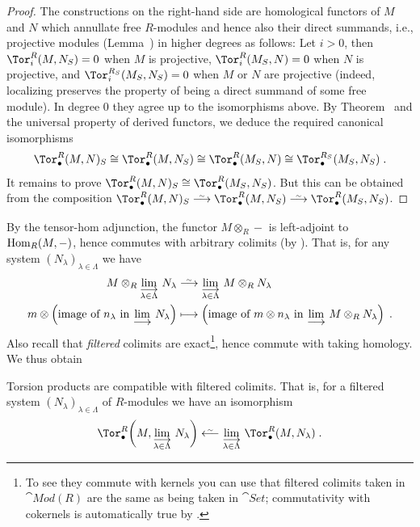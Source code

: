 \documentclass[a4paper,parskip=half,numbers=enddot, DIV=12]{scrreprt}
\begin{document}
\begin{proof}
	The constructions on the right-hand side are homological functors of $M$ and $N$ which annullate free $R$-modules and hence also their direct summands, i.e., projective modules (Lemma~) in higher degrees as follows: Let $i>0$, then $\Tor_i^R(M,N_S)=0$ when $M$ is projective, $\Tor_i^R(M_S,N)=0$ when $N$ is projective, and $\Tor_i^{R_S}(M_S,N_S)=0$ when $M$ or $N$ are projective (indeed, localizing preserves the property of being a direct summand of some free module). In degree $0$ they agree up to the isomorphisms above. By Theorem~ and the universal property of derived functors, we deduce the required canonical isomorphisms
	\begin{align*}
		\Tor_\bullet^R(M,N)_S\cong \Tor_\bullet^R(M,N_S)\cong \Tor_\bullet^R(M_S,N) \cong \Tor_\bullet^{R_S}(M_S,N_S)\;.
	\end{align*}
	It remains to prove $\Tor_\bullet^R(M,N)_S\cong \Tor_\bullet^R(M_S,N_S)$. But this can be obtained from the composition $\Tor_\bullet^R(M,N)_S\isomorphism \Tor_\bullet^R(M,N_S)\isomorphism \Tor_\bullet^R(M_S,N_S)$.
\end{proof}
By the tensor-hom adjunction, the functor $M\otimes_R-$ is left-adjoint to $\operatorname{Hom}_R(M,-)$, hence commutes with arbitrary colimits (by \cite[Corollary~A.1.1]{alggeo2}). That is, for any system $(N_\lambda)_{\lambda\in\Lambda}$ we have
\begin{align*}
	M\otimes_R\colimit[\lambda\in\Lambda]N_\lambda&\isomorphism \colimit[\lambda\in\Lambda]M\otimes_RN_\lambda\\
	m\otimes\left(\text{image of }n_\lambda\text{ in }\colimit N_\lambda\right)&\longmapsto \left(\text{image of }m\otimes n_\lambda\text{ in }\colimit M\otimes_RN_\lambda\right)\;.
\end{align*}
Also recall that \emph{filtered} colimits are exact\footnote{To see they commute with kernels you can use that filtered colimits taken in $\cat{Mod}(R)$ are the same as being taken in $\cat{Set}$; commutativity with cokernels is automatically true by \cite[Corollary~A.1.1]{alggeo2}.}, hence commute with taking homology. We thus obtain
\begin{fact}
	Torsion products are compatible with filtered colimits. That is, for a filtered system $(N_\lambda)_{\lambda\in\Lambda}$ of $R$-modules we have an isomorphism
	\begin{align*}
		\Tor_\bullet^R\bigg(M,\colimit[\lambda\in\Lambda]N_\lambda\bigg)\lisomorphism \colimit[\lambda\in\Lambda]\Tor_\bullet^R(M,N_\lambda)\;.
	\end{align*}
\end{fact}
\end{document}
